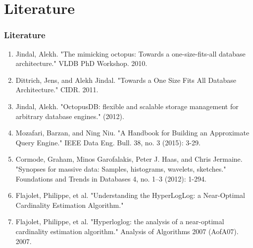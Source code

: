 \documentclass{beamer}
\begin{document}
\section{Literature}
\begin{frame}
\frametitle{Literature}
\begin{enumerate}
\fontsize{8}{5}\selectfont \item{Jindal, Alekh. "The mimicking octopus: Towards a one-size-fits-all database architecture." VLDB PhD Workshop. 2010.}
\item{Dittrich, Jens, and Alekh Jindal. "Towards a One Size Fits All Database Architecture." CIDR. 2011.}
\item{Jindal, Alekh. "OctopusDB: flexible and scalable storage management for arbitrary database engines." (2012).}
\item{Mozafari, Barzan, and Ning Niu. "A Handbook for Building an Approximate Query Engine." IEEE Data Eng. Bull. 38, no. 3 (2015): 3-29.}
\item{Cormode, Graham, Minos Garofalakis, Peter J. Haas, and Chris Jermaine. "Synopses for massive data: Samples, histograms, wavelets, sketches." Foundations and Trends in Databases 4, no. 1–3 (2012): 1-294.}
\item{Flajolet, Philippe, et al. "Understanding the HyperLogLog: a Near-Optimal Cardinality Estimation Algorithm."}
\item{Flajolet, Philippe, et al. "Hyperloglog: the analysis of a near-optimal cardinality estimation algorithm." Analysis of Algorithms 2007 (AofA07). 2007.}
\end{enumerate}
\end{frame}
\end{document}
